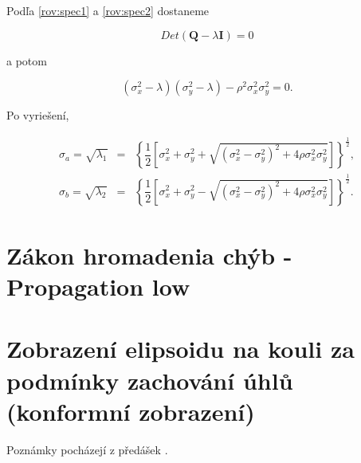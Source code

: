 Podľa \ref{rov:spec1} a \ref{rov:spec2} dostaneme

\begin{equation}
Det(\mathbf{Q } - \lambda\mathbf{I})  = 0
\end{equation}

a potom

\begin{equation}
\left(\sigma_x^2 - \lambda\right)\left(\sigma_y^2 - \lambda\right) - \rho^2\sigma_x^2\sigma_y^2 = 0.
\end{equation}

Po vyriešení,

\begin{eqnarray}
 \sigma_a = \sqrt{\lambda_1}  &=& \left\lbrace \dfrac{1}{2} \left[ \sigma_x^2 + \sigma_y^2 + \sqrt{\left(\sigma_x^2-\sigma_y^2\right)^2 +4\rho\sigma_{x}^2\sigma_{y}^2} \right]\right\rbrace^{\frac{1}{2}} , \\
\sigma_b = \sqrt{\lambda_2} &=& \left\lbrace \dfrac{1}{2} \left[ \sigma_x^2 + \sigma_y^2 - \sqrt{\left(\sigma_x^2-\sigma_y^2\right)^2 +4\rho\sigma_{x}^2\sigma_{y}^2} \right]\right\rbrace^{\frac{1}{2}} .
\end{eqnarray}

 
\section{Zákon hromadenia chýb - Propagation low}



\section{Zobrazení elipsoidu na kouli za podmínky zachování úhlů (konformní zobrazení)}

Poznámky pocházejí z předášek \cite{Cajthaml2014}.


